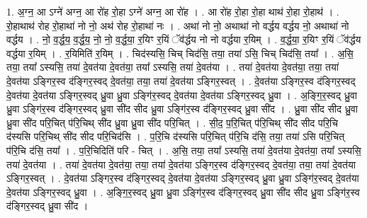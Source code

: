 \documentclass[17pt]{extarticle}
\begin{document}
1. अ॒ग्न॒ आ ऽग्ने॑ अग्न॒ आ रो॑ह रो॒हा ऽग्ने॑ अग्न॒ आ रो॑ह । . आ रो॑ह रो॒हा रो॒हा थाथ॑ रो॒हा रो॒हाथ॑ । . रो॒हाथाथ॑ रोह रो॒हाथा॑ नो नो॒ अथ॑ रोह रो॒हाथा॑ नः । . अथा॑ नो नो॒ अथाथा॑ नो वर्द्धय वर्द्धय नो॒ अथाथा॑ नो वर्द्धय । . नो॒ व॒र्द्ध॒य॒ व॒र्द्ध॒य॒ नो॒ नो॒ व॒र्द्ध॒या॒ र॒यिꣳ र॒यिं ॅव॑र्द्धय नो नो वर्द्धया र॒यिम् । . व॒र्द्ध॒या॒ र॒यिꣳ र॒यिं ॅव॑र्द्धय वर्द्धया र॒यिम् । . र॒यिमिति॑ र॒यिम् । . चिद॑स्यसि॒ चिच् चिद॑सि॒ तया॒ तया॑ ऽसि॒ चिच् चिद॑सि॒ तया᳚ । . अ॒सि॒ तया॒ तया᳚ ऽस्यसि॒ तया॑ दे॒वत॑या दे॒वत॑या॒ तया᳚ ऽस्यसि॒ तया॑ दे॒वत॑या । . तया॑ दे॒वत॑या दे॒वत॑या॒ तया॒ तया॑ दे॒वत॑या ऽङ्गिर॒स्व द॑ङ्गिर॒स्वद् दे॒वत॑या॒ तया॒ तया॑ दे॒वत॑या ऽङ्गिर॒स्वत् । . दे॒वत॑या ऽङ्गिर॒स्व द॑ङ्गिर॒स्वद् दे॒वत॑या दे॒वत॑या ऽङ्गिर॒स्वद् ध्रु॒वा ध्रु॒वा ऽङ्गि॑र॒स्वद् दे॒वत॑या दे॒वत॑या ऽङ्गिर॒स्वद् ध्रु॒वा । . अ॒ङ्गि॒र॒स्वद् ध्रु॒वा ध्रु॒वा ऽङ्गि॑र॒स्व द॑ङ्गिर॒स्वद् ध्रु॒वा सी॑द सीद ध्रु॒वा ऽङ्गि॑र॒स्व द॑ङ्गिर॒स्वद् ध्रु॒वा सी॑द । . ध्रु॒वा सी॑द सीद ध्रु॒वा ध्रु॒वा सी॑द परि॒चित् प॑रि॒चिथ् सी॑द ध्रु॒वा ध्रु॒वा सी॑द परि॒चित् । . सी॒द॒ प॒रि॒चित् प॑रि॒चिथ् सी॑द सीद परि॒चि द॑स्यसि परि॒चिथ् सी॑द सीद परि॒चिद॑सि । . प॒रि॒चि द॑स्यसि परि॒चित् प॑रि॒चि द॑सि॒ तया॒ तया॑ ऽसि परि॒चित् प॑रि॒चि द॑सि॒ तया᳚ । . प॒रि॒चिदिति॑ परि - चित् । . अ॒सि॒ तया॒ तया᳚ ऽस्यसि॒ तया॑ दे॒वत॑या दे॒वत॑या॒ तया᳚ ऽस्यसि॒ तया॑ दे॒वत॑या । . तया॑ दे॒वत॑या दे॒वत॑या॒ तया॒ तया॑ दे॒वत॑या ऽङ्गिर॒स्व द॑ङ्गिर॒स्वद् दे॒वत॑या॒ तया॒ तया॑ दे॒वत॑या ऽङ्गिर॒स्वत् । . दे॒वत॑या ऽङ्गिर॒स्व द॑ङ्गिर॒स्वद् दे॒वत॑या दे॒वत॑या ऽङ्गिर॒स्वद् ध्रु॒वा ध्रु॒वा ऽङ्गि॑र॒स्वद् दे॒वत॑या दे॒वत॑या ऽङ्गिर॒स्वद् ध्रु॒वा । . अ॒ङ्गि॒र॒स्वद् ध्रु॒वा ध्रु॒वा ऽङ्गि॑र॒स्व द॑ङ्गिर॒स्वद् ध्रु॒वा सी॑द सीद ध्रु॒वा ऽङ्गि॑र॒स्व द॑ङ्गिर॒स्वद् ध्रु॒वा सी॑द । \newline
\end{document}
